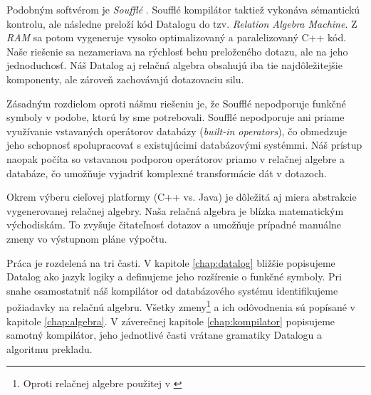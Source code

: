 Podobným softvérom je \textit{Soufflé} \cite{souffle_translate}. Soufflé kompilátor taktiež vykonáva
sémantickú kontrolu, ale následne preloží kód Datalogu do tzv. \textit{Relation Algebra Machine}. Z
\textit{RAM} sa potom vygeneruje vysoko optimalizovaný a paralelizovaný C++ kód. Naše riešenie sa
nezameriava na rýchlosť behu preloženého dotazu, ale na jeho jednoduchosť. Náš Datalog aj relačná
algebra obsahujú iba tie najdôležitejšie komponenty, ale zároveň zachovávajú dotazovaciu silu. 

Zásadným rozdielom oproti nášmu riešeniu je, že Soufflé nepodporuje funkčné symboly v podobe, ktorú
by sme potrebovali. Soufflé nepodporuje ani priame využívanie vstavaných operátorov databázy
(\textit{built-in operators}), čo obmedzuje jeho schopnosť spolupracovať s existujúcimi databázovými
systémmi. Náš prístup naopak počíta so vstavanou podporou operátorov priamo v relačnej algebre a
databáze, čo umožňuje vyjadriť komplexné transformácie dát v dotazoch.

Okrem výberu cieľovej platformy (C++ vs. Java) je dôležitá aj miera abstrakcie vygenerovanej
relačnej algebry. Naša relačná algebra je blízka matematickým východiskám. To zvyšuje čitateľnosť
dotazov a umožňuje prípadné manuálne zmeny vo výstupnom pláne výpočtu.

Práca je rozdelená na tri časti. V kapitole \ref{chap:datalog} bližšie popisujeme Datalog ako jazyk
logiky a definujeme jeho rozšírenie o funkčné symboly. Pri snahe osamostatniť náš kompilátor od
databázového systému identifikujeme požiadavky na relačnú algebru. Všetky zmeny\footnote{Oproti
relačnej algebre použitej v \cite{RAcompilator}} a ich odôvodnenia sú popísané v kapitole
\ref{chap:algebra}. V záverečnej kapitole \ref{chap:kompilator} popisujeme samotný kompilátor, jeho
jednotlivé časti vrátane gramatiky Datalogu a algoritmu prekladu.
